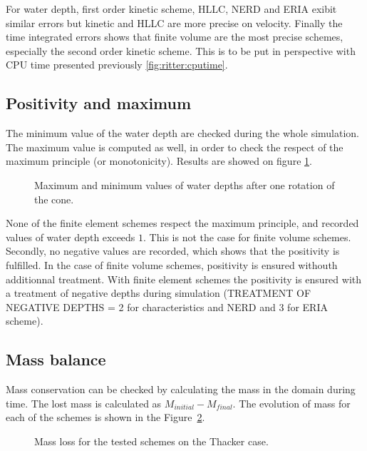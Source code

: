 For water depth, first order kinetic scheme, HLLC, NERD and ERIA exibit similar errors but kinetic and HLLC are more precise on velocity.
Finally the time integrated errors shows that finite volume are the most precise schemes, especially the second order kinetic scheme.
This is to be put in perspective with CPU time presented previously \ref{fig:ritter:cputime}.

\subsection{Positivity and maximum}

The minimum value of the water depth are checked during the whole simulation. 
The maximum value is computed as well, in order to check the respect of the maximum principle (or monotonicity). 
Results are showed on figure \ref{t2d:ritter:minmax}. 

\begin{figure}[H]
\centering
{}
\caption{Maximum and minimum values of water depths after one rotation of the cone.}
\label{t2d:ritter:minmax}
\end{figure}

None of the finite element schemes respect the maximum principle, and recorded values of water depth exceeds $1$.
This is not the case for finite volume schemes.
Secondly, no negative values are recorded, which shows that the positivity is fulfilled.
In the case of finite volume schemes, positivity is ensured withouth additionnal treatment.
With finite element schemes the positivity is ensured with a treatment of negative depths
during simulation (TREATMENT OF NEGATIVE DEPTHS = 2 for characteristics and NERD and 3 for ERIA scheme).

\subsection{Mass balance}

Mass conservation can be checked by calculating the mass in the domain during time.
The lost mass is calculated as $M_{initial} - M_{final}$.
The evolution of mass for each of the schemes is shown in the Figure~\ref{fig:ritter:VoLTime}.

\begin{figure}[H]
\centering
  \caption{Mass loss for the tested schemes on the Thacker case.}
\label{fig:ritter:VoLTime}
\end{figure}

